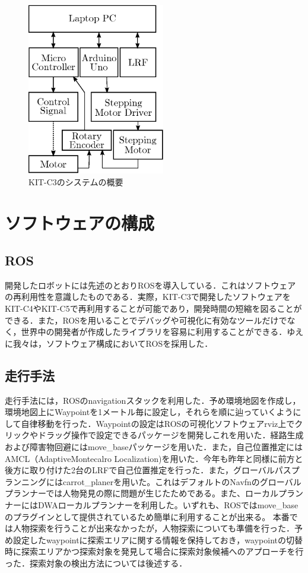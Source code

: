 \documentclass[10pt,a4paper]{jarticle}
\begin{document}
\begin{figure}[tbp]
  \centering
  \includegraphics[width=6cm]{fig/eps/kitc3_overview.eps}
  \caption{KIT-C3のシステムの概要}
  \label{225251_18Dec14}
\end{figure}

\section{ソフトウェアの構成}
\subsection{ROS}
開発したロボットには先述のとおりROSを導入している．これはソフトウェアの再利用性を意識したものである．実際，KIT-C3で開発したソフトウェアをKIT-C4やKIT-C5で再利用することが可能であり，開発時間の短縮を図ることができる．また，ROSを用いることでデバッグや可視化に有効なツールだけでなく，世界中の開発者が作成したライブラリを容易に利用することができる．ゆえに我々は，ソフトウェア構成においてROSを採用した．
\subsection{走行手法}
走行手法には，ROSのnavigationスタックを利用した．予め環境地図を作成し，環境地図上にWaypointを1メートル毎に設定し，それらを順に辿っていくようにして自律移動を行った．Waypointの設定はROSの可視化ソフトウェアrviz上でクリックやドラッグ操作で設定できるパッケージを開発しこれを用いた．経路生成および障害物回避にはmove\_baseパッケージを用いた．また，自己位置推定にはAMCL（AdaptiveMontecalro Localization)を用いた．今年も昨年と同様に前方と後方に取り付けた2台のLRFで自己位置推定を行った．また，グローバルパスプランニングにはcarrot\_planerを用いた。これはデフォルトのNavfnのグローバルプランナーでは人物発見の際に問題が生じたためである。また、ローカルプランナーにはDWAローカルプランナーを利用した。いずれも、ROSではmove\_baseのプラグインとして提供されているため簡単に利用することが出来る。
本番では人物探索を行うことが出来なかったが，人物探索についても準備を行った．予め設定したwaypointに探索エリアに関する情報を保持しておき，waypointの切替時に探索エリアかつ探索対象を発見して場合に探索対象候補へのアプローチを行った．探索対象の検出方法については後述する．
\end{document}
